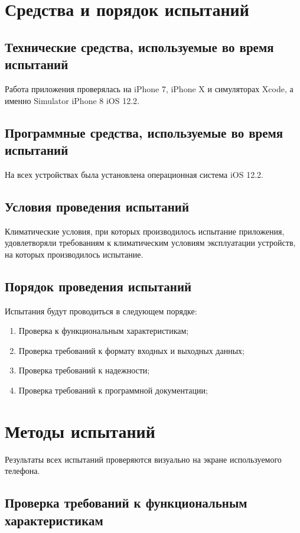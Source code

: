 \documentclass[a4paper,12pt]{article}
\begin{document}
						\newpage
	\section{Средства и порядок испытаний}
	\subsection{Технические средства, используемые во время испытаний}
	Работа приложения проверялась на iPhone 7, iPhone X и симуляторах Xcode, а именно Simulator iPhone 8 iOS 12.2.
	
	\subsection{Программные средства, используемые во время испытаний}
	
	На всех устройствах была установлена операционная система iOS 12.2.
	\subsection{Условия проведения испытаний}
	
	Климатические условия, при которых производилось испытание приложения, удовлетворяли требованиям к климатическим условиям эксплуатации устройств, на которых производилось испытание.
	\subsection{Порядок проведения испытаний}
	
	Испытания будут проводиться в следующем порядке:
	\begin{enumerate}
		\item Проверка к функциональным характеристикам;
		\item Проверка требований к формату входных и выходных данных;
		\item Проверка требований к надежности; 
		\item Проверка требований к программной документации;
	\end{enumerate}
	
						\newpage
	\section{Методы испытаний}
	Результаты всех испытаний проверяются визуально на экране используемого телефона.
	\subsection{Проверка требований к функциональным характеристикам}
\end{document}
